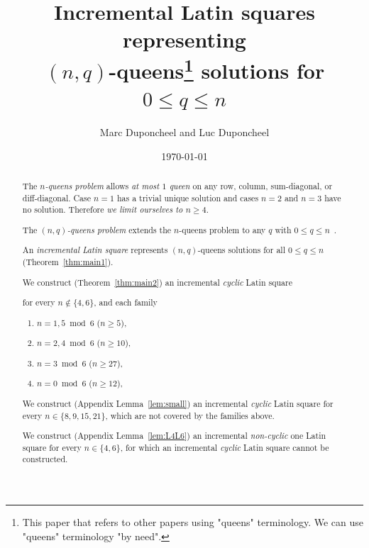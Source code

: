 \documentclass[10pt,a4paper]{article}
\title{\textbf{
  Incremental Latin squares representing \\
  $(n,q)$-queens\footnote{
    This paper that refers to other papers using "queens" terminology. We can use "queens"
    terminology "by need".
  } solutions for $0 \le q \le n$
}}
\author{Marc Duponcheel and Luc Duponcheel}
\date{\today}
\theoremstyle{remark}
\begin{document}
\maketitle

\begin{abstract}

\noindent The \emph{$n$-queens problem} allows \emph{at most $1$ queen} on any row, column,
sum-diagonal, or diff-diagonal. Case $n = 1$ has a trivial unique solution and cases $n = 2$ and
$n = 3$ have no solution. Therefore \emph{we limit ourselves to $n \ge 4$}.

\vspace{4pt}

\noindent The \emph{$(n,q)$-queens problem} extends the $n$-queens problem to any $q$ with
$0 \le q \le n$~\cite{LLW1990}. 

\vspace{4pt}

\noindent An \emph{incremental Latin square} represents $(n,q)$-queens solutions for all 
$0 \le q \le n$ (Theorem~\ref{thm:main1}).

\vspace{4pt}

\noindent We construct (Theorem~\ref{thm:main2}) an incremental \emph{cyclic} Latin square

\vspace{4pt}

\noindent for every $n \notin \{4, 6\}$, and each family
\begin{enumerate}
\item $n = 1,5 \bmod 6$ ($n \ge 5$),
\item $n = 2,4 \bmod 6$ ($n \ge 10$),
\item $n = 3 \bmod 6$ ($n \ge 27$),
\item $n = 0 \bmod 6$ ($n \ge 12$),
\end{enumerate}

\vspace{4pt}

\noindent We construct (Appendix Lemma~\ref{lem:small}) an incremental \emph{cyclic} Latin square
for every $n \in \{8, 9, 15, 21\}$, which are not covered by the families above.

\vspace{4pt}

\noindent We construct (Appendix Lemma~\ref{lem:L4L6}) an incremental \emph{non-cyclic} one Latin
square for every $n \in \{4, 6\}$, for which an incremental \emph{cyclic} Latin square cannot be
constructed.


\end{abstract}
\end{document}
